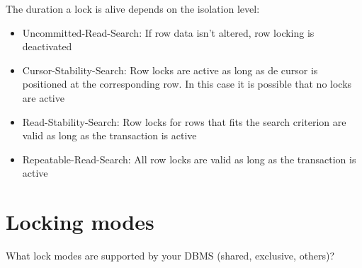 \documentclass{vldb}
\begin{document}
The duration a lock is alive depends on the isolation level:
\begin{itemize}
\item Uncommitted-Read-Search: If row data isn't altered, row locking is deactivated
\item Cursor-Stability-Search: Row locks are active as long as de cursor is positioned at the corresponding row. 
In this case it is possible that no locks are active
\item Read-Stability-Search: Row locks for rows that fits the search criterion are valid as long as the transaction is active
\item Repeatable-Read-Search: All row locks are valid as long as the transaction is active
\end{itemize}

\section{Locking modes}

What lock modes are supported by your DBMS (shared, exclusive, others)?\\
\end{document}
